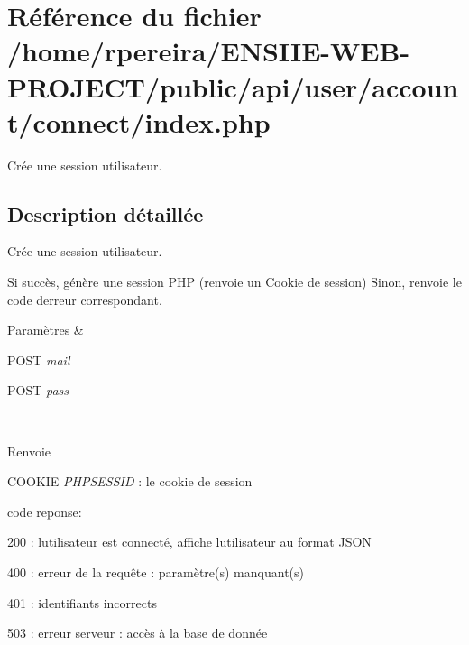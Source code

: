 \hypertarget{user_2account_2connect_2index_8php}{}\section{Référence du fichier /home/rpereira/\+E\+N\+S\+I\+I\+E-\/\+W\+E\+B-\/\+P\+R\+O\+J\+E\+C\+T/public/api/user/account/connect/index.php}
\label{user_2account_2connect_2index_8php}


Crée une session utilisateur.  




\subsection{Description détaillée}
Crée une session utilisateur. 

Si succès, génère une session P\+HP (renvoie un Cookie de session) Sinon, renvoie le code d\textquotesingle{}erreur correspondant. 
\begin{DoxyParams}{Paramètres}
{\em } & 
\begin{DoxyItemize}
\item P\+O\+ST {\itshape mail} 
\item P\+O\+ST {\itshape pass} 
\end{DoxyItemize}\\
\hline
\end{DoxyParams}
\begin{DoxyReturn}{Renvoie}

\begin{DoxyItemize}
\item C\+O\+O\+K\+IE {\itshape P\+H\+P\+S\+E\+S\+S\+ID} \+: le cookie de session
\item code reponse\+:
\begin{DoxyItemize}
\item 200 \+: l\textquotesingle{}utilisateur est connecté, affiche l\textquotesingle{}utilisateur au format J\+S\+ON
\item 400 \+: erreur de la requête \+: paramètre(s) manquant(s)
\item 401 \+: identifiants incorrects
\item 503 \+: erreur serveur \+: accès à la base de donnée 
\end{DoxyItemize}
\end{DoxyItemize}
\end{DoxyReturn}
